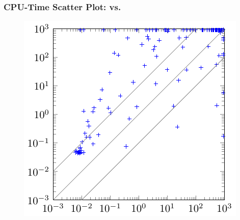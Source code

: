 \begin{frame}
    \frametitle{CPU-Time Scatter Plot: \erssat vs. \dcssat}
    \begin{figure}
        \centering
        \includegraphics{fig/exist-random-ssat/scatter-dcssat.pdf}
    \end{figure}
\end{frame}

